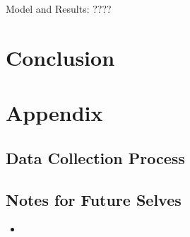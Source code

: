 \documentclass[a4paper,11pt]{article}
\begin{document}
Model and Results: ????

\section{Conclusion}


\newpage
\printbibliography

\newpage
\section*{Appendix}
\subsection*{Data Collection Process}

\subsection*{Notes for Future Selves}
\begin{itemize}
    \item 
\end{itemize}
\end{document}
